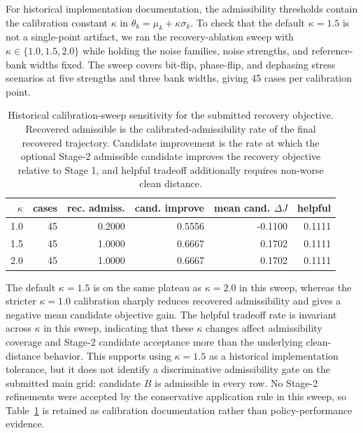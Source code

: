 \documentclass[11pt]{article}
\numberwithin{equation}{section}
\begin{document}
For historical implementation documentation, the admissibility thresholds contain
the calibration constant $\kappa$ in
$\theta_k=\mu_k+\kappa\sigma_k$. To check that the default $\kappa=1.5$ is not a
single-point artifact, we ran the recovery-ablation sweep with
$\kappa\in\{1.0,1.5,2.0\}$ while holding the noise families, noise strengths, and
reference-bank widths fixed. The sweep covers bit-flip, phase-flip, and dephasing
stress scenarios at five strengths and three bank widths, giving 45 cases per
calibration point.

\begin{table}[ht]
\centering
\scriptsize
\setlength{\tabcolsep}{4pt}
\caption{Historical calibration-sweep sensitivity for the submitted recovery objective.
Recovered admissible is the calibrated-admissibility rate of the final recovered
trajectory. Candidate improvement is the rate at which the optional Stage-2
admissible candidate improves the recovery objective relative to Stage 1, and
helpful tradeoff additionally requires non-worse clean distance.}
\label{tab:kappa-sens}
\begin{tabular}{@{}rrrrrr@{}}
\toprule
$\kappa$ & cases & rec. admiss. & cand. improve &
mean cand. $\Delta J$ & helpful \\
\midrule
1.0 & 45 & 0.2000 & 0.5556 & -0.1100 & 0.1111 \\
1.5 & 45 & 1.0000 & 0.6667 & 0.1702 & 0.1111 \\
2.0 & 45 & 1.0000 & 0.6667 & 0.1702 & 0.1111 \\
\bottomrule
\end{tabular}
\end{table}

The default $\kappa=1.5$ is on the same plateau as $\kappa=2.0$ in this sweep,
whereas the stricter $\kappa=1.0$ calibration sharply reduces recovered
admissibility and gives a negative mean candidate objective gain. The helpful
tradeoff rate is invariant across $\kappa$ in this sweep, indicating that these
$\kappa$ changes affect admissibility coverage and Stage-2 candidate acceptance
more than the underlying clean-distance behavior. This supports using
$\kappa=1.5$ as a historical implementation tolerance, but it does not identify
a discriminative admissibility gate on the submitted main grid: candidate $B$ is
admissible in every row. No Stage-2 refinements were accepted by the conservative
application rule in this sweep, so Table~\ref{tab:kappa-sens} is retained as
calibration documentation rather than policy-performance evidence.
\end{document}
